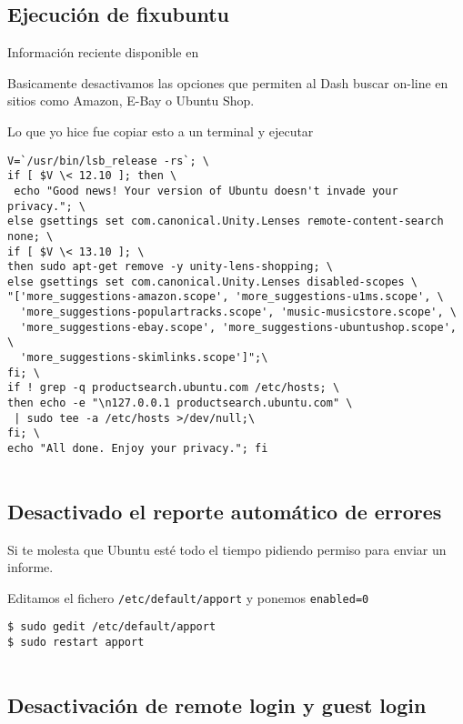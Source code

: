 \subsection{Ejecución de fixubuntu}\label{ejecuciuxf3n-de-fixubuntu}

Información reciente disponible en

Basicamente desactivamos las opciones que permiten al Dash buscar
on-line en sitios como Amazon, E-Bay o Ubuntu Shop.

Lo que yo hice fue copiar esto a un terminal y ejecutar

\begin{verbatim}
V=`/usr/bin/lsb_release -rs`; \
if [ $V \< 12.10 ]; then \
 echo "Good news! Your version of Ubuntu doesn't invade your privacy."; \
else gsettings set com.canonical.Unity.Lenses remote-content-search none; \
if [ $V \< 13.10 ]; \
then sudo apt-get remove -y unity-lens-shopping; \
else gsettings set com.canonical.Unity.Lenses disabled-scopes \
"['more_suggestions-amazon.scope', 'more_suggestions-u1ms.scope', \
  'more_suggestions-populartracks.scope', 'music-musicstore.scope', \
  'more_suggestions-ebay.scope', 'more_suggestions-ubuntushop.scope', \
  'more_suggestions-skimlinks.scope']";\
fi; \
if ! grep -q productsearch.ubuntu.com /etc/hosts; \
then echo -e "\n127.0.0.1 productsearch.ubuntu.com" \
 | sudo tee -a /etc/hosts >/dev/null;\
fi; \
echo "All done. Enjoy your privacy."; fi
      
\end{verbatim}

\subsection{Desactivado el reporte automático de
errores}\label{desactivado-el-reporte-automuxe1tico-de-errores}

Si te molesta que Ubuntu esté todo el tiempo pidiendo permiso para
enviar un informe.

Editamos el fichero \texttt{/etc/default/apport} y ponemos
\texttt{enabled=0}

\begin{verbatim}
$ sudo gedit /etc/default/apport
$ sudo restart apport
      
\end{verbatim}

\subsection{Desactivación de remote login y guest
login}\label{desactivaciuxf3n-de-remote-login-y-guest-login}

